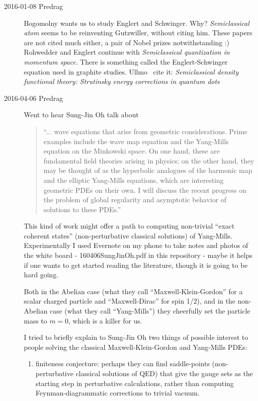 \begin{description}
\item[2016-01-08 Predrag]
Bogomolny wants us to study Englert and
Schwinger. Why?
 {\em Semiclassical atom} seems to be reinventing
Gutzwiller, without citing him. These papers are not cited much either, a
pair of Nobel prizes notwithstanding :) Rohwedder and
Englert continue with {\em Semiclassical quantization in
momentum space}. There is something called the Englert-Schwinger equation
used in graphite studies. Ullmo~\etal{} cite it:
{\em Semiclassical density functional theory: {Strutinsky} energy
corrections in quantum dots}

\item[2016-04-06 Predrag]
Went to hear
{Sung-Jin Oh} talk about

\begin{quote}
``... wave equations that arise from geometric
considerations. Prime examples include the wave map equation and
the Yang-Mills equation on the Minkowski space. On one hand, these
are fundamental field theories arising in physics; on the other hand,
they may be thought of as the hyperbolic analogues of the harmonic map
and the elliptic Yang-Mills equations, which are interesting geometric
PDEs on their own. I will discuss the recent progress on the problem of
global regularity and asymptotic behavior of solutions to these PDEs.''
\end{quote}

This kind of work might offer a path to computing non-trivial ``exact
coherent states'' (non-perturbative classical solutions) of Yang-Mills.
Experimentally I used Evernote on my phone to take notes and photos of
the white board -
 {160406SungJinOh.pdf} in this repository -
maybe it helps if one wants to get started reading the literature, though
it is going to be hard going.

Both in the Abelian case (what they call ``Maxwell-Klein-Gordon'' for a
scalar charged particle and ``Maxwell-Dirac'' for spin 1/2), and in the
non-Abelian case (what they call ``Yang-Mills'') they cheerfully set the
particle mass to $m=0$, which is a killer for us.

I tried to briefly explain to Sung-Jin Oh two things of possible interest
to people solving the classical Maxwell-Klein-Gordon and Yang-Mills PDEs:

\begin{enumerate}
  \item
{}
{finiteness conjecture}: perhaps they can find saddle-points
(non-perturbative classical solutions of QED) that give the
gauge sets as the starting step in perturbative calculations,
rather than computing Feynman-diagrammatic corrections to trivial vacuum.


\end{enumerate}
\end{description}
